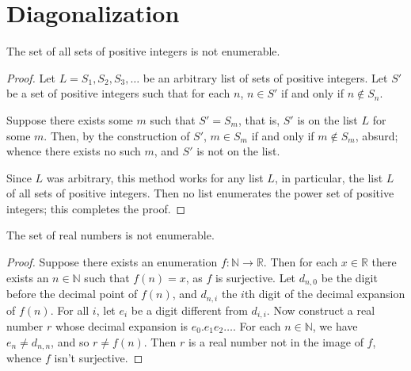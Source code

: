 \section{Diagonalization} %
\label{sec:diagonalization}
\begin{theorem}[Cantor]
  The set of all sets of positive integers is not enumerable.
\end{theorem}
\begin{proof}
  Let $L = S_1, S_2, S_3, \ldots$ be an arbitrary list of sets of positive integers.
  Let $S'$ be a set of positive integers such that for each $n$, $n \in S'$ if and only if $n \not\in S_n$.

  Suppose there exists some $m$ such that $S' = S_m$, that is, $S'$ is on the list $L$ for some $m$.
  Then, by the construction of $S'$, $m \in S_m$ if and only if $m \not\in S_m$, absurd; whence there exists no such $m$, and $S'$ is not on the list.

  Since $L$ was arbitrary, this method works for any list $L$, in particular, the list $L$ of all sets of positive integers.
  Then no list enumerates the power set of positive integers; this completes the proof.
\end{proof}

\begin{theorem}
  The set of real numbers is not enumerable.
\end{theorem}
\begin{proof}
  Suppose there exists an enumeration $f\colon \mathbb N \to \mathbb R$.
  Then for each $x \in \mathbb R$ there exists an $n \in \mathbb N$ such that $f(n) = x$, as $f$ is surjective.
  Let $d_{n,0}$ be the digit before the decimal point of $f(n)$, and $d_{n,i}$ the $i$th digit of the decimal expansion of $f(n)$.
  For all $i$, let $e_i$ be a digit different from $d_{i,i}$.
  Now construct a real number $r$ whose decimal expansion is $e_0.e_1e_2\ldots$.
  For each $n \in \mathbb N$, we have $e_n \ne d_{n,n}$, and so $r \ne f(n)$.
  Then $r$ is a real number not in the image of $f$, whence $f$ isn't surjective.
\end{proof}

